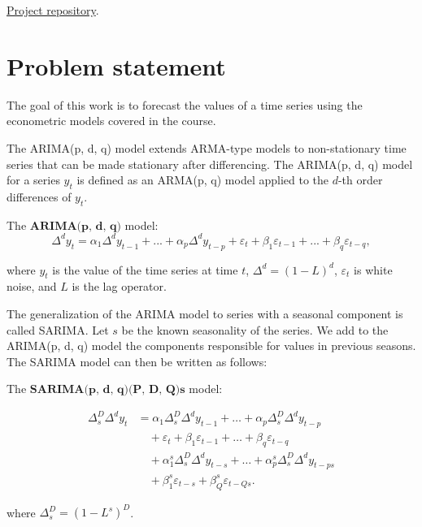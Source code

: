 \documentclass[]{article}
\begin{document}
{
	\Large
	\href{https://github.com/MaximKiryakin/quant-finance-projects/tree/main/sales-forecasting}{Project repository}.
}

\section{Problem statement}

The goal of this work is to forecast the values of a time series using the econometric models covered in the course.

The ARIMA(p, d, q) model extends ARMA-type models to non-stationary time series that can be made stationary after differencing. The ARIMA(p, d, q) model for a series $y_t$ is defined as an ARMA(p, q) model applied to the $d$-th order differences of $y_t$.

The $\textbf{ARIMA(p, d, q)}$ model:
\begin{equation*}
	\Delta^d y_t = \alpha_1 \Delta^d y_{t-1} + ... + \alpha_p\Delta^dy_{t-p} + \varepsilon_t + \beta_1\varepsilon_{t-1} + ... + \beta_q\varepsilon_{t-q},
\end{equation*}

where $y_t$ is the value of the time series at time $t$, $\Delta^d = (1 - L)^d$, $\varepsilon_t$ is white noise, and $L$ is the lag operator.

The generalization of the ARIMA model to series with a seasonal component is called SARIMA. Let $s$ be the known seasonality of the series. We add to the ARIMA(p, d, q) model the components responsible for values in previous seasons. The SARIMA model can then be written as follows:

The $\textbf{SARIMA(p, d, q)(P, D, Q)s}$ model:

\begin{equation*}
	\begin{split}
		\Delta^D_s\Delta^d y_t
		&= \alpha_1\Delta^D_s \Delta^d y_{t-1} + \dots + \alpha_p\Delta^D_s\Delta^dy_{t-p} \\
		&\quad+ \varepsilon_t + \beta_1\varepsilon_{t-1} + \dots + \beta_q\varepsilon_{t-q} \\
		&\quad+ \alpha_1^s\Delta^D_s \Delta^d y_{t-s} + \dots + \alpha_p^s\Delta^D_s \Delta^d y_{t-ps} \\
		&\quad+ \beta_1^s\varepsilon_{t-s}+\beta_Q^s\varepsilon_{t-Qs}.
	\end{split}
\end{equation*}

where $\Delta^D_s = (1 - L^s)^D$.
\end{document}
